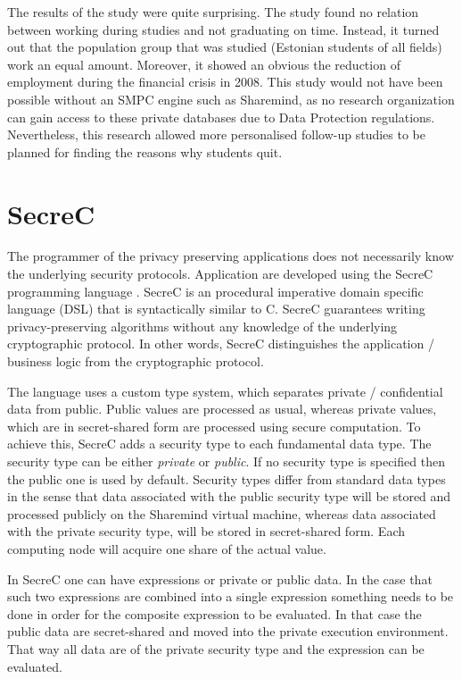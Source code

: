 The results of the study were quite surprising.
The study found no relation between working during studies and not graduating on time.
Instead, it turned out that the population group that was studied (Estonian students of all fields) work an equal amount.
Moreover, it showed an obvious the reduction of employment during the financial crisis in 2008.
This study would not have been possible without an SMPC engine such as Sharemind, as no research organization can gain access to these private databases due to Data Protection regulations.
Nevertheless, this research allowed more personalised follow-up studies to be planned for finding the reasons why students quit.



\section{SecreC}\label{s:secrec}

The programmer of the privacy preserving applications does not necessarily know the underlying security protocols.
Application are developed using the SecreC programming language \cite{jagomagis2010secrec}.
SecreC is an procedural imperative domain specific language (DSL) that is syntactically similar to C. SecreC guarantees writing privacy-preserving algorithms without any knowledge of the underlying cryptographic protocol.
In other words, SecreC distinguishes the application / business logic from the cryptographic protocol.

The language uses a custom type system, which separates private / confidential data from public.
Public values are processed as usual, whereas private values, which are in secret-shared form are processed using secure computation.
To achieve this, SecreC adds a security type to each fundamental data type.
The security type can be either \textit{private} or \textit{public}.
If no security type is specified then the public one is used by default.
Security types differ from standard data types in the sense that data associated with the public security type will be stored and processed publicly on the Sharemind virtual machine, whereas data associated with the private security type, will be stored in secret\hyp shared form.
Each computing node will acquire one share of the actual value.

In SecreC one can have expressions or private or public data.
In the case that such two expressions are combined into a single expression something needs to be done in order for the composite expression to be evaluated.
In that case the public data are secret\hyp shared and moved into the private execution environment.
That way all data are of the private security type and the expression can be evaluated.

